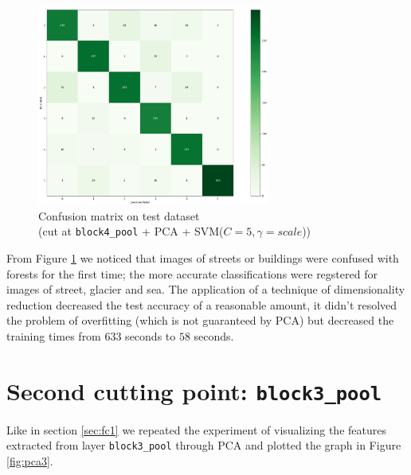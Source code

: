 \documentclass[compsoc]{IEEEtran}
\begin{document}
\begin{figure}[ht!]
\centering                                                                        
\includegraphics[width=3in]{../images/cm2-pca-test.png}
\captionsetup{justification=centering}                                                                                         
\caption{Confusion matrix on test dataset \\ (cut at \texttt{block4\_pool} + PCA + SVM($C=5, \gamma=scale$))}
\label{fig:cm2-pca-test}                                                                                                                               
\end{figure}

From Figure \ref{fig:cm2-pca-test} we noticed that images of streets or buildings were confused with forests for the first time; the more accurate classifications were regstered for images of street, glacier and sea. 
The application of a technique of dimensionality reduction
decreased the test accuracy of a reasonable amount, it didn't resolved the problem of overfitting (which is not guaranteed by PCA) but decreased the training times from $633$ seconds to $58$ seconds. 











\section{Second cutting point: \texttt{block3\_pool}}


Like in section \ref{sec:fc1} we repeated the experiment of visualizing the features extracted from layer \texttt{block3\_pool} through PCA and plotted the graph in Figure \ref{fig:pca3}.
\end{document}
